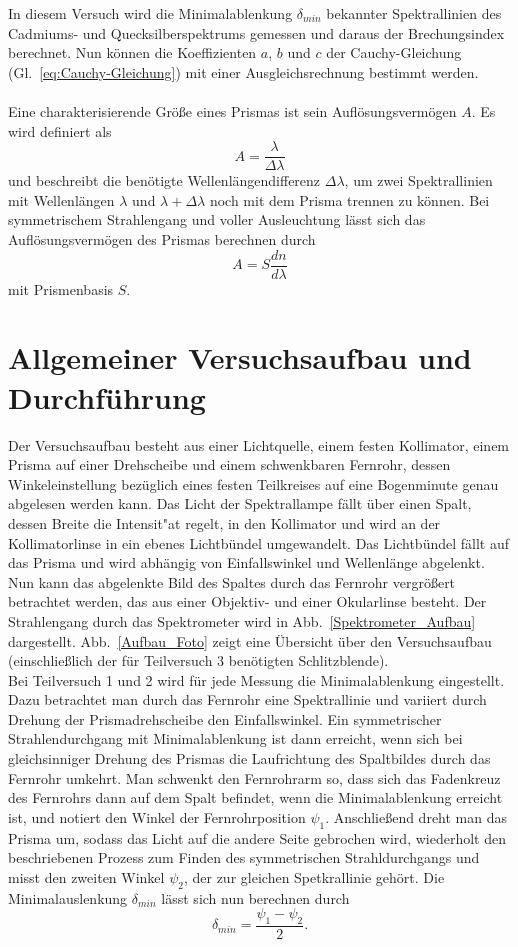 \documentclass[12pt,a4paper]{article}
\begin{document}
In diesem Versuch wird die Minimalablenkung $\delta_{min}$ bekannter Spektrallinien des Cadmiums- und Quecksilberspektrums gemessen und daraus der Brechungsindex berechnet. Nun können die Koeffizienten $a$, $b$ und $c$ der Cauchy-Gleichung (Gl.~\eqref{eq:Cauchy-Gleichung}) mit einer Ausgleichsrechnung bestimmt werden.\\\\
Eine charakterisierende Größe eines Prismas ist sein Auflösungsvermögen $A$. Es wird definiert als 
\begin{equation}
A=\frac{\lambda}{\Delta\lambda}
\end{equation}
und beschreibt die benötigte Wellenlängendifferenz $\Delta\lambda$, um zwei Spektrallinien mit Wellenlängen $\lambda$ und $\lambda+\Delta\lambda$ noch mit dem Prisma trennen zu können. Bei symmetrischem Strahlengang und voller Ausleuchtung lässt sich das Auflösungsvermögen des Prismas berechnen durch
\begin{equation}
A=S\frac{dn}{d\lambda}
\end{equation}
mit Prismenbasis $S$.
\section{Allgemeiner Versuchsaufbau und Durchführung}
Der Versuchsaufbau besteht aus einer Lichtquelle, einem festen Kollimator, einem Prisma auf einer Drehscheibe und einem schwenkbaren Fernrohr, dessen Winkeleinstellung bezüglich eines festen Teilkreises auf eine Bogenminute genau abgelesen werden kann. Das Licht der Spektrallampe fällt über einen Spalt, dessen Breite die Intensit"at regelt, in den Kollimator und wird an der Kollimatorlinse in ein ebenes Lichtbündel umgewandelt. Das Lichtbündel fällt auf das Prisma und wird abhängig von Einfallswinkel und Wellenlänge abgelenkt. Nun kann das abgelenkte Bild des Spaltes durch das Fernrohr vergrößert betrachtet werden, das aus einer Objektiv- und einer Okularlinse besteht. Der Strahlengang durch das Spektrometer wird in Abb.~\ref{Spektrometer_Aufbau} dargestellt. Abb.~\ref{Aufbau_Foto} zeigt eine Übersicht über den Versuchsaufbau (einschließlich der für Teilversuch 3 benötigten Schlitzblende).\\
Bei Teilversuch 1 und 2 wird für jede Messung die Minimalablenkung eingestellt. Dazu betrachtet man durch das Fernrohr eine Spektrallinie und variiert durch Drehung der Prismadrehscheibe den Einfallswinkel. Ein symmetrischer Strahlendurchgang mit Minimalablenkung ist dann erreicht, wenn sich bei gleichsinniger Drehung des Prismas die Laufrichtung des Spaltbildes durch das Fernrohr umkehrt. Man schwenkt den Fernrohrarm so, dass sich das Fadenkreuz des Fernrohrs dann auf dem Spalt befindet, wenn die Minimalablenkung erreicht ist, und notiert den Winkel der Fernrohrposition $\psi_1$. Anschließend dreht man das Prisma um, sodass das Licht auf die andere Seite gebrochen wird, wiederholt den beschriebenen Prozess zum Finden des symmetrischen Strahldurchgangs und misst den zweiten Winkel $\psi_2$, der zur gleichen Spetkrallinie gehört. Die Minimalauslenkung $\delta_{min}$ lässt sich nun berechnen durch
\begin{equation}\label{eq:delmin_aus_psi}
\delta_{min}=\frac{\psi_1-\psi_2}{2}.
\end{equation}
\end{document}

